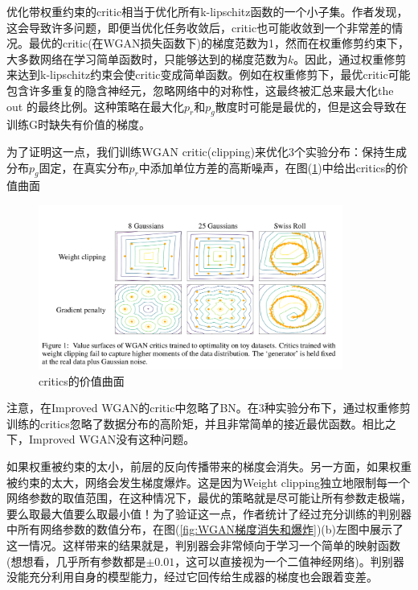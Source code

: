             \par
            优化带权重约束的critic相当于优化所有k-lipschitz函数的一个小子集。作者发现，这会导致许多问题，即便当优化任务收敛后，critic也可能收敛到一个非常差的情况。最优的critic(在WGAN损失函数下)的梯度范数为1，然而在权重修剪约束下，大多数网络在学习简单函数时，只能够达到的梯度范数为$k$。因此，通过权重修剪来达到k-lipschitz约束会使critic变成简单函数。例如在权重修剪下，最优critic可能包含许多重复的隐含神经元，忽略网络中的对称性，这最终被汇总来最大化the out 的最终比例。这种策略在最大化$p_r$和$p_g$散度时可能是最优的，但是这会导致在训练G时缺失有价值的梯度。
            \par
            为了证明这一点，我们训练WGAN critic(clipping)来优化3个实验分布：保持生成分布$p_g$固定，在真实分布$p_r$中添加单位方差的高斯噪声，在图(\ref{fig:critics的价值曲面})中给出critics的价值曲面
                \begin{figure}[H]
                \centering
                \includegraphics[width=10cm]{images/Critics_of_value_of_the_surface.jpg}
                \caption{critics的价值曲面}
                \label{fig:critics的价值曲面}
                \end{figure}
            注意，在Improved WGAN的critic中忽略了BN。在3种实验分布下，通过权重修剪训练的critics忽略了数据分布的高阶矩，并且非常简单的接近最优函数。相比之下，Improved WGAN没有这种问题。
            \par
            如果权重被约束的太小，前层的反向传播带来的梯度会消失。另一方面，如果权重被约束的太大，网络会发生梯度爆炸。这是因为Weight clipping独立地限制每一个网络参数的取值范围，在这种情况下，最优的策略就是尽可能让所有参数走极端，要么取最大值要么取最小值！为了验证这一点，作者统计了经过充分训练的判别器中所有网络参数的数值分布，在图(\ref{fig:WGAN梯度消失和爆炸})(b)左图中展示了这一情况。这样带来的结果就是，判别器会非常倾向于学习一个简单的映射函数(想想看，几乎所有参数都是$\pm0.01$，这可以直接视为一个二值神经网络)。判别器没能充分利用自身的模型能力，经过它回传给生成器的梯度也会跟着变差。
